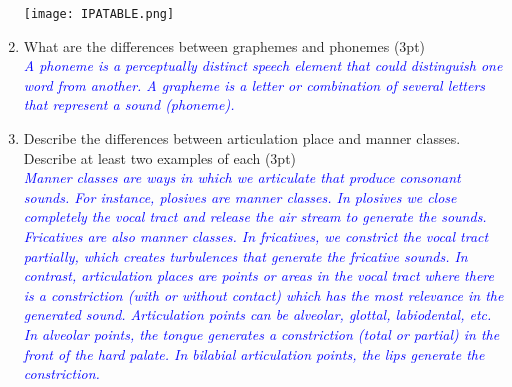 \documentclass[12pt]{article}
\newcommand{\solution}[2]{\textcolor{blue}{\em #1}} %
\begin{document}
\begin{enumerate}
\vspace{-1cm}
\begin{center}
    \texttt{[image: IPATABLE.png]}\vspace{-1cm}
\end{center}


\newpage
\item What are the differences between graphemes and phonemes (3pt) \\
\solution{A phoneme is a perceptually distinct speech element that could distinguish one word from another. A grapheme is a letter or combination of several letters that represent a sound (phoneme).}{\vspace{5cm}}


\item Describe the differences between articulation place and manner classes. Describe at least two examples of each (3pt)  \\
\solution{Manner classes are ways in which we articulate that produce consonant sounds. For instance, plosives are manner classes. In plosives we close completely the vocal tract and release the air stream to generate the sounds. Fricatives are also manner classes. In fricatives, we constrict the vocal tract partially, which creates turbulences that generate the fricative sounds.
In contrast, articulation places are points or areas in the vocal tract where there is a constriction (with or without contact) which has the most relevance in the generated sound. Articulation points can be alveolar, glottal, labiodental, etc. In alveolar points, the tongue generates a constriction (total or partial) in the front of the hard palate. In bilabial articulation points, the lips generate the constriction.
}{\vspace{3cm}}

\end{enumerate}
\end{document}
